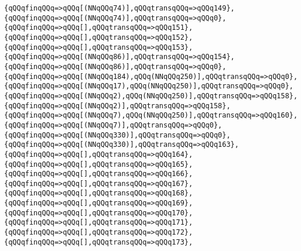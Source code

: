 \verb|{qQQqfinqQQq=>qQQq[(NNqQQq74)],qQQqtransqQQq=>qQQq149},|\newline
\verb|{qQQqfinqQQq=>qQQq[(NNqQQq74)],qQQqtransqQQq=>qQQq0},|\newline
\verb|{qQQqfinqQQq=>qQQq[],qQQqtransqQQq=>qQQq151},|\newline
\verb|{qQQqfinqQQq=>qQQq[],qQQqtransqQQq=>qQQq152},|\newline
\verb|{qQQqfinqQQq=>qQQq[],qQQqtransqQQq=>qQQq153},|\newline
\verb|{qQQqfinqQQq=>qQQq[(NNqQQq86)],qQQqtransqQQq=>qQQq154},|\newline
\verb|{qQQqfinqQQq=>qQQq[(NNqQQq86)],qQQqtransqQQq=>qQQq0},|\newline
\verb|{qQQqfinqQQq=>qQQq[(NNqQQq184),qQQq(NNqQQq250)],qQQqtransqQQq=>qQQq0},|\newline
\verb|{qQQqfinqQQq=>qQQq[(NNqQQq17),qQQq(NNqQQq250)],qQQqtransqQQq=>qQQq0},|\newline
\verb|{qQQqfinqQQq=>qQQq[(NNqQQq2),qQQq(NNqQQq250)],qQQqtransqQQq=>qQQq158},|\newline
\verb|{qQQqfinqQQq=>qQQq[(NNqQQq2)],qQQqtransqQQq=>qQQq158},|\newline
\verb|{qQQqfinqQQq=>qQQq[(NNqQQq7),qQQq(NNqQQq250)],qQQqtransqQQq=>qQQq160},|\newline
\verb|{qQQqfinqQQq=>qQQq[(NNqQQq7)],qQQqtransqQQq=>qQQq0},|\newline
\verb|{qQQqfinqQQq=>qQQq[(NNqQQq330)],qQQqtransqQQq=>qQQq0},|\newline
\verb|{qQQqfinqQQq=>qQQq[(NNqQQq330)],qQQqtransqQQq=>qQQq163},|\newline
\verb|{qQQqfinqQQq=>qQQq[],qQQqtransqQQq=>qQQq164},|\newline
\verb|{qQQqfinqQQq=>qQQq[],qQQqtransqQQq=>qQQq165},|\newline
\verb|{qQQqfinqQQq=>qQQq[],qQQqtransqQQq=>qQQq166},|\newline
\verb|{qQQqfinqQQq=>qQQq[],qQQqtransqQQq=>qQQq167},|\newline
\verb|{qQQqfinqQQq=>qQQq[],qQQqtransqQQq=>qQQq168},|\newline
\verb|{qQQqfinqQQq=>qQQq[],qQQqtransqQQq=>qQQq169},|\newline
\verb|{qQQqfinqQQq=>qQQq[],qQQqtransqQQq=>qQQq170},|\newline
\verb|{qQQqfinqQQq=>qQQq[],qQQqtransqQQq=>qQQq171},|\newline
\verb|{qQQqfinqQQq=>qQQq[],qQQqtransqQQq=>qQQq172},|\newline
\verb|{qQQqfinqQQq=>qQQq[],qQQqtransqQQq=>qQQq173},|\newline
